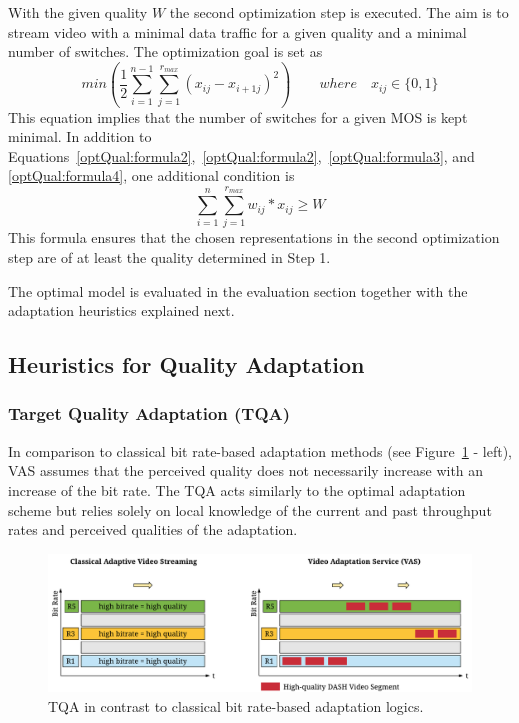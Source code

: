 With the given quality $W$ the second optimization step is executed.
The aim is to stream video with a minimal data traffic for a given quality and a minimal number of switches.
The optimization goal is set as
\begin{equation}
\label{optQual:formula5}
min( \frac{1}{2} \sum\limits_{i=1}^{n-1}\sum\limits_{j=1}^{r_{max}} (x_{ij} - x_{i+1j})^2) \quad\quad where\quad x_{ij} \in \{0,1\}
\end{equation} 
This equation implies that the number of switches for a given \ac{MOS} is kept minimal.
In addition to Equations~\ref{optQual:formula2},~\ref{optQual:formula2},~\ref{optQual:formula3}, and \ref{optQual:formula4}, one additional condition is
\begin{equation}
\label{optQual:formula6}
\sum\limits_{i=1}^{n}\sum\limits_{j=1}^{r_{max}} w_{ij} * x_{ij} \geq W
\end{equation}
This formula ensures that the chosen representations in the second optimization step are of at least the quality determined in Step 1. 

The optimal model is evaluated in the evaluation section together with the adaptation heuristics explained next. 
\subsection{Heuristics for Quality Adaptation}
\subsubsection{Target Quality Adaptation (TQA)}
\label{sec:726_target_quality}
In comparison to classical bit rate-based adaptation methods (see Figure~\ref{fig:720_Adaptations} - left), \ac{VAS} assumes that the perceived quality does not necessarily increase with an increase of the bit rate.
The \ac{TQA} acts similarly to the optimal adaptation scheme but relies solely on local knowledge of the current and past throughput rates and perceived qualities of the adaptation.

\begin{figure}[tbh!]
	\centering
	\includegraphics[width=0.85\linewidth]{./gfx/700_VAS/TargetMOS}
	\caption{TQA in contrast to classical bit rate-based adaptation logics.}
	\label{fig:720_Adaptations}
\end{figure}

